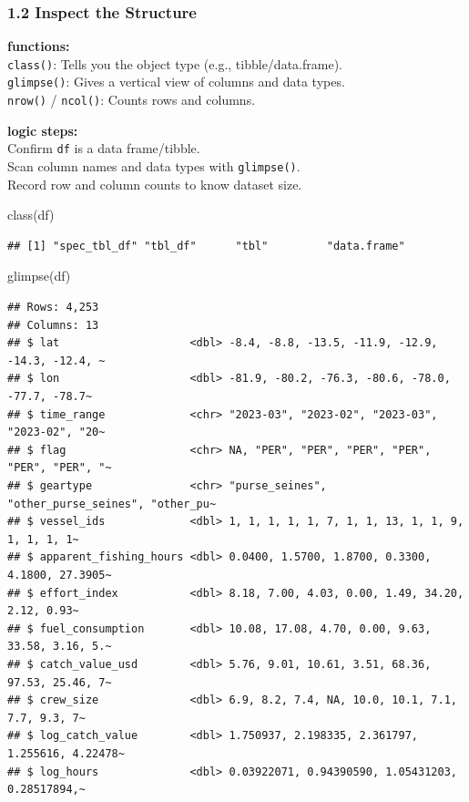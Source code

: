 \documentclass[
]{article}
\newenvironment{Shaded}{\begin{snugshade}}{\end{snugshade}}
\newcommand{\FunctionTok}[1]{\textcolor[rgb]{0.00,0.00,0.00}{#1}}
\newcommand{\NormalTok}[1]{#1}
\begin{document}
\hypertarget{inspect-the-structure}{%
\subsubsection{1.2 Inspect the Structure}\label{inspect-the-structure}}

\textbf{functions:}\\
\texttt{class()}: Tells you the object type (e.g., tibble/data.frame).\\
\texttt{glimpse()}: Gives a vertical view of columns and data types.\\
\texttt{nrow()} / \texttt{ncol()}: Counts rows and columns.

\textbf{logic steps:}\\
Confirm \texttt{df} is a data frame/tibble.\\
Scan column names and data types with \texttt{glimpse()}.\\
Record row and column counts to know dataset size.

\begin{Shaded}
\begin{Highlighting}[]
\FunctionTok{class}\NormalTok{(df)}
\end{Highlighting}
\end{Shaded}

\begin{verbatim}
## [1] "spec_tbl_df" "tbl_df"      "tbl"         "data.frame"
\end{verbatim}

\begin{Shaded}
\begin{Highlighting}[]
\FunctionTok{glimpse}\NormalTok{(df)}
\end{Highlighting}
\end{Shaded}

\begin{verbatim}
## Rows: 4,253
## Columns: 13
## $ lat                    <dbl> -8.4, -8.8, -13.5, -11.9, -12.9, -14.3, -12.4, ~
## $ lon                    <dbl> -81.9, -80.2, -76.3, -80.6, -78.0, -77.7, -78.7~
## $ time_range             <chr> "2023-03", "2023-02", "2023-03", "2023-02", "20~
## $ flag                   <chr> NA, "PER", "PER", "PER", "PER", "PER", "PER", "~
## $ geartype               <chr> "purse_seines", "other_purse_seines", "other_pu~
## $ vessel_ids             <dbl> 1, 1, 1, 1, 1, 7, 1, 1, 13, 1, 1, 9, 1, 1, 1, 1~
## $ apparent_fishing_hours <dbl> 0.0400, 1.5700, 1.8700, 0.3300, 4.1800, 27.3905~
## $ effort_index           <dbl> 8.18, 7.00, 4.03, 0.00, 1.49, 34.20, 2.12, 0.93~
## $ fuel_consumption       <dbl> 10.08, 17.08, 4.70, 0.00, 9.63, 33.58, 3.16, 5.~
## $ catch_value_usd        <dbl> 5.76, 9.01, 10.61, 3.51, 68.36, 97.53, 25.46, 7~
## $ crew_size              <dbl> 6.9, 8.2, 7.4, NA, 10.0, 10.1, 7.1, 7.7, 9.3, 7~
## $ log_catch_value        <dbl> 1.750937, 2.198335, 2.361797, 1.255616, 4.22478~
## $ log_hours              <dbl> 0.03922071, 0.94390590, 1.05431203, 0.28517894,~
\end{verbatim}
\end{document}
